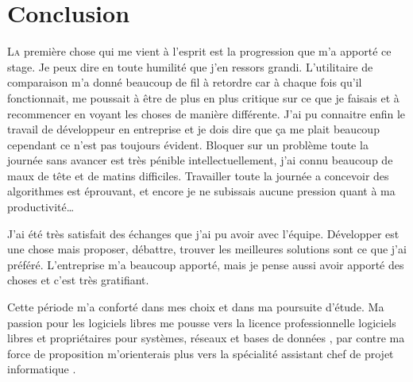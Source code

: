 \chapter{Conclusion} %
\label{cha:Conclusion}

\lettrine{L}{a} première chose qui me vient à l'esprit est la
progression que m'a apporté ce stage. Je peux dire en toute humilité que
j'en ressors grandi.  L'utilitaire de comparaison m'a donné beaucoup de
fil à retordre car à chaque fois qu'il fonctionnait,  me
poussait à être de plus en plus critique sur ce que je faisais et à
recommencer en voyant les choses de manière différente.  J'ai pu
connaitre enfin le travail de développeur en entreprise et je dois dire
que ça me plait beaucoup cependant ce n'est pas toujours évident.
Bloquer sur un problème toute la journée sans avancer est très pénible
intellectuellement, j'ai connu beaucoup de maux de tête et de matins
difficiles. Travailler toute la journée a concevoir des algorithmes est
éprouvant, et encore je ne subissais aucune pression quant à ma
productivité\dots

J'ai été très satisfait des échanges que j'ai pu avoir avec l'équipe.
Développer est une chose mais proposer, débattre, trouver les meilleures
solutions sont ce que j'ai préféré. L'entreprise m'a beaucoup apporté,
mais je pense aussi avoir apporté des choses et c'est très gratifiant.

Cette période m'a conforté dans mes choix et dans ma poursuite d'étude.
Ma passion pour les logiciels libres me pousse vers la licence
professionnelle \og logiciels libres et propriétaires pour systèmes,
réseaux et bases de données \fg{}, par contre ma force de proposition
m'orienterais plus vers la \og spécialité assistant chef de projet
informatique \fg{}.
